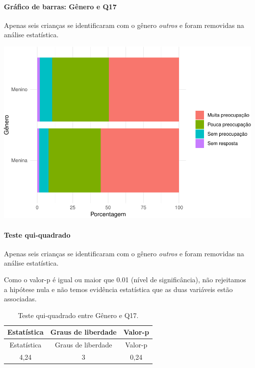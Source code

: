 \documentclass[]{article}
\let\oldparagraph\paragraph
\renewcommand{\paragraph}[1]{\oldparagraph{#1}\mbox{}}
\begin{document}
\hypertarget{gruxe1fico-de-barras-guxeanero-e-q17}{%
\paragraph{Gráfico de barras: Gênero e Q17}\label{gruxe1fico-de-barras-guxeanero-e-q17}}

Apenas seis crianças se identificaram com o gênero \emph{outros} e foram removidas na análise estatística.

\begin{center}\includegraphics[width=0.75\linewidth]{relatorio_covid19_files/figure-latex/unnamed-chunk-201-1} \end{center}

\hypertarget{teste-qui-quadrado-18}{%
\paragraph{Teste qui-quadrado}\label{teste-qui-quadrado-18}}

Apenas seis crianças se identificaram com o gênero \emph{outros} e foram removidas na análise estatística.

Como o valor-p é igual ou maior que 0.01 (nível de significância), não rejeitamos a hipótese nula e não temos evidência estatística que as duas variáveis estão associadas.

\begin{longtable}[]{@{}ccc@{}}
\caption{\label{tab:unnamed-chunk-203}Teste qui-quadrado entre Gênero e Q17.}\tabularnewline
\toprule
Estatística & Graus de liberdade & Valor-p\tabularnewline
\midrule
\endfirsthead
\toprule
Estatística & Graus de liberdade & Valor-p\tabularnewline
\midrule
\endhead
4,24 & 3 & 0,24\tabularnewline
\bottomrule
\end{longtable}

\cleardoublepage
\end{document}
